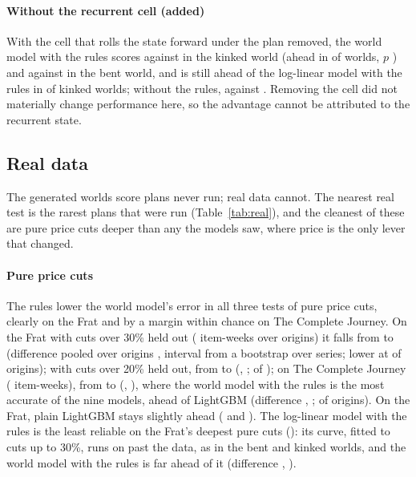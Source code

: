 \paragraph{Without the recurrent cell (added)} With the cell that rolls the state forward under the plan removed, the
world model with the rules scores \nsKShapeA{} against \nsKShapeB{} in the kinked world (ahead in \nsKShapeWon{} of
\nsKShapeN{} worlds, $p$ \nsKShapeP{}) and \nsBShapeA{} against \nsBShapeB{} in the bent world, and is still ahead of
the log-linear model with the rules in \nsKLlWon{} of \nsKLlN{} kinked worlds; without the rules, \nsKPlainA{} against
\nsKPlainB{}. Removing the cell did not materially change performance here, so the advantage cannot be attributed to the recurrent state.



\subsection{Real data}

The generated worlds score plans never run; real data cannot. The nearest real test is the rarest plans that were
run (Table~\ref{tab:real}), and the cleanest of these are pure price cuts deeper than any the models saw, where
price is the only lever that changed.

\paragraph{Pure price cuts} The rules lower the world model's error in all three tests of pure price cuts, clearly on
the Frat and by a margin within chance on The Complete Journey. On the Frat with cuts over
30\% held out (\rnFPure{} item-weeks over \roFPure{} origins) it falls from \reFPureWm{} to \reFPureWmShape{}
(difference pooled over origins \rpFPureWmShapeVWm{}, interval \rpFPureWmShapeVWmCi{} from a bootstrap over series; lower at
\rpFPureWmShapeVWmWon{} of \rpFPureWmShapeVWmOf{} origins); with cuts over 20\% held out, from \reTPureWm{} to
\reTPureWmShape{} (\rpTPureWmShapeVWm{}, \rpTPureWmShapeVWmCi{}; \rpTPureWmShapeVWmWon{} of
\rpTPureWmShapeVWmOf{}); on The Complete Journey (\rnCPure{} item-weeks), from \reCPureWm{} to \reCPureWmShape{}
(\rpCPureWmShapeVWm{}, \rpCPureWmShapeVWmCi{}), where the world model with the rules is the most accurate of the
nine models, ahead of LightGBM (difference \rpCPureWmShapeVLgb{}, \rpCPureWmShapeVLgbCi{}; \rpCPureWmShapeVLgbWon{} of
\rpCPureWmShapeVLgbOf{} origins). On the Frat, plain LightGBM stays slightly ahead (\reFPureLgb{} and
\reTPureLgb{}). The log-linear model with the rules is the least reliable on the Frat's deepest pure cuts
(\reFPureLlShape{}): its curve, fitted to cuts up to 30\%, runs on past the data, as in the bent and kinked worlds,
and the world model with the rules is far ahead of it (difference \rpFPureWmShapeVLlShape{},
\rpFPureWmShapeVLlShapeCi{}).

